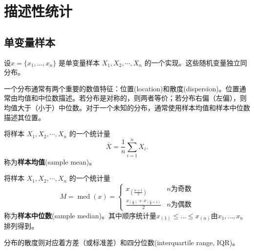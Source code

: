\chapter{描述性统计}

\section{单变量样本}

设$x = \{x_1,\dots,x_n\}$ 是单变量样本 $X_1,X_2,\cdots,X_n$ 的一个实现。这些随机变量独立同分布。

一个分布通常有两个重要的数值特征：位置(location)和散度(dispersion)。位置通常由均值和中位数描述。若分布是对称的，则两者等价；若分布右偏（左偏），则均值大于（小于）中位数。对于一个未知的分布，通常使用样本均值和样本中位数描述其位置。

\begin{definition}[样本均值]\label{def:sample mean}
    将样本 $X_1,X_2,\cdots,X_n$ 的一个统计量 
    \[ \overline{X} = \frac1n\sum_{i=1}^{n}X_{i}. \]
    称为\textbf{样本均值}(sample mean)。
\end{definition}

\begin{definition}[样本均值]\label{def:sample median}
    将样本 $X_1,X_2,\cdots,X_n$ 的一个统计量 
    \[ M = \operatorname{med}(x) = \begin{cases}
        x_{(\frac{n+1}{2})} & n \text{为奇数} \\
        \frac{x_{(\frac{n}{2})} + x_{(\frac{n}{2}+1)}}{2} & n \text{为偶数}
    \end{cases} \]
    称为\textbf{样本中位数}(sample median)。其中顺序统计量$x_{(1)}\leq\dots\leq x_{(n)}$由$x_1,\dots,x_n$排列得到。
\end{definition}

分布的散度则对应着方差（或标准差）和四分位数(interquartile range, IQR)。


